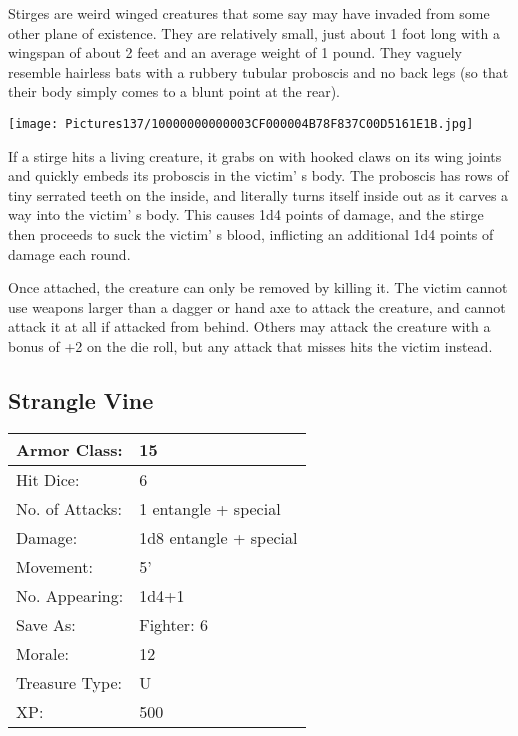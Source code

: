 \documentclass[a4paper,twoside,openany,10pt]{book}
\begin{document}
\begin{multicols}{2}
Stirges are weird winged creatures that some say may have invaded from some other plane of existence. They are relatively small, just about 1 foot long with a wingspan of about 2 feet and an average weight of 1 pound. They vaguely resemble hairless bats with a rubbery tubular proboscis and no back legs (so that their body simply comes to a blunt point at the rear).


\begin{center} \texttt{[image: Pictures137/10000000000003CF000004B78F837C00D5161E1B.jpg]} \end{center}

If a stirge hits a living creature, it grabs on with hooked claws on its wing joints and quickly embeds its proboscis in the victim' s body. The proboscis has rows of tiny serrated teeth on the inside, and literally turns itself inside out as it carves a way into the victim' s body. This causes 1d4 points of damage, and the stirge then proceeds to suck the victim' s blood, inflicting an additional 1d4 points of damage each round.

Once attached, the creature can only be removed by killing it. The victim cannot use weapons larger than a dagger or hand axe to attack the creature, and cannot attack it at all if attacked from behind. Others may attack the creature with a bonus of +2 on the die roll, but any attack that misses hits the victim instead.

\subsection*{Strangle Vine}\label{strangle-vine}

\begin{tabularx}{0.50\textwidth}{@{}lX@{}}
Armor Class: & 15 \\\hline
Hit Dice: & 6 \\\hline
No. of Attacks: & 1 entangle + special \\\hline
Damage: & 1d8 entangle + special \\\hline
Movement: & 5' \\\hline
No. Appearing: & 1d4+1 \\\hline
Save As: & Fighter: 6 \\\hline
Morale: & 12 \\\hline
Treasure Type: & U \\\hline
XP: & 500 \\\hline
\end{tabularx}\medskip


\end{multicols}
\end{document}
